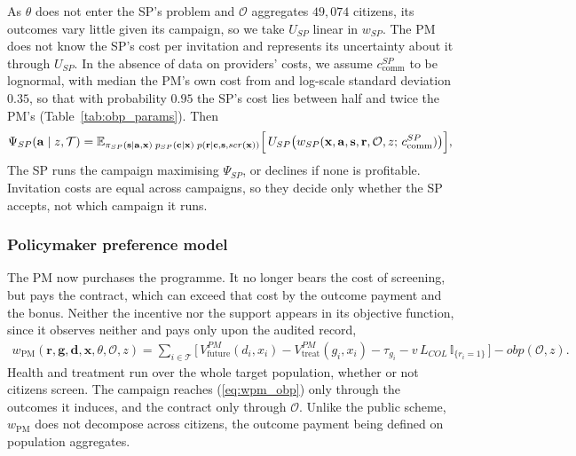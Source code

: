 \documentclass[12pt]{article}
\begin{document}
As $\theta$ does not enter the SP's problem and $\mathcal{O}$ aggregates $49{,}074$ citizens, its outcomes vary little given its campaign, so we take $U_{SP}$ linear in $w_{SP}$. The PM does not know the SP's cost per invitation and represents its uncertainty about it through $U_{SP}$. In the absence of data on providers' costs, we assume $c^{SP}_{\text{comm}}$ to be lognormal, with median the PM's own cost from \citet{arrospide2018cost} and log-scale standard deviation $0.35$, so that with probability $0.95$ the SP's cost lies between half and twice the PM's (Table~\ref{tab:obp_params}). Then
\begin{align}\label{eq:psi_sp}
  \Psi_{SP}(\mathbf{a} \mid z, \mathcal{T}) =
    \mathbb{E}_{\pi_{SP}(\mathbf{s} \mid \mathbf{a}, \mathbf{x})\;
                p_{SP}(\mathbf{c} \mid \mathbf{x})\;
                p(\mathbf{r} \mid \mathbf{c}, \mathbf{s}, scr(\mathbf{x}))}
      \Bigl[\, U_{SP}\bigl( w_{SP}(\mathbf{x}, \mathbf{a}, \mathbf{s}, \mathbf{r},
        \mathcal{O}, z;\, c^{SP}_{\text{comm}}) \bigr) \Bigr],
\end{align}
The SP runs the campaign maximising $\Psi_{SP}$, or declines if none is profitable. Invitation costs are equal across campaigns, so they decide only whether the SP accepts, not which campaign it runs.


\subsubsection{Policymaker preference model}
The PM now purchases the programme. It no longer bears the cost of screening, but pays the contract, which can exceed that cost by the outcome payment and the bonus. Neither the incentive nor the support appears in its objective function, since it observes neither and pays only upon the audited record,
\begin{align}\label{eq:wpm_obp}
w_\text{PM}(\mathbf{r}, \mathbf{g}, \mathbf{d}, \mathbf{x}, \theta, \mathcal{O}, z)
= \sum_{i \in \mathcal{T}} \bigl[\,
    V^{PM}_{\text{future}}(d_i, x_i) - V^{PM}_{\text{treat}}(g_i, x_i) - \tau_{g_i}
  - v\,L_{COL}\,\mathbb{I}_{\{r_i=1\}} \,\bigr]
  - obp(\mathcal{O}, z).
\end{align}
Health and treatment run over the whole target population, whether or not citizens screen. The campaign reaches (\ref{eq:wpm_obp}) only through the outcomes it induces, and the contract only through $\mathcal{O}$. Unlike the public scheme, $w_\text{PM}$ does not decompose across citizens, the outcome payment being defined on population aggregates.
\end{document}
